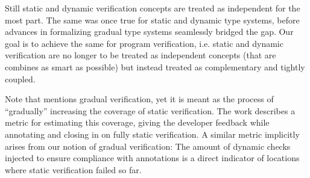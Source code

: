 Still static and dynamic verification concepts are treated as independent for the most part.
The same was once true for static and dynamic type systems, before advances in formalizing gradual type systems seamlessly bridged the gap.
Our goal is to achieve the same for program verification, i.e. static and dynamic verification are no longer to be treated as independent concepts (that are combines as smart as possible) but instead treated as complementary and tightly coupled.

Note that \cite{arlt2014gradual} mentions gradual verification, yet it is meant as the process of “gradually” increasing the coverage of static verification.
The work describes a metric for estimating this coverage, giving the developer feedback while annotating and closing in on fully static verification.
A similar metric implicitly arises from our notion of gradual verification: The amount of dynamic checks injected to ensure compliance with annotations is a direct indicator of locations where static verification failed so far.